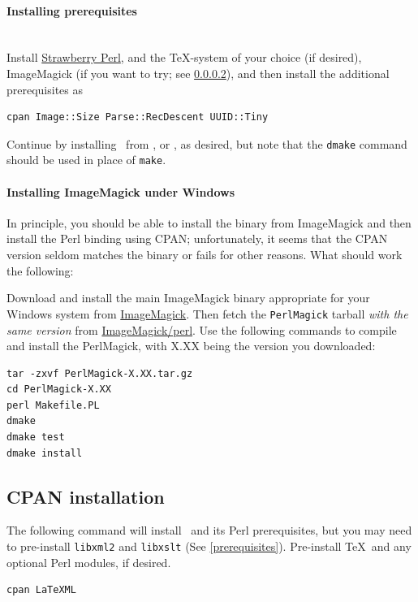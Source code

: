 \documentclass{article}
\begin{document}
\paragraph{Installing prerequisites}\label{install.windows.prereq}\\
Install \href{http://strawberryperl.com}{Strawberry Perl}, and
the \TeX-system of your choice (if desired), 
ImageMagick (if you want to try; see \ref{install.windows.imagemagick}),
and then install the additional prerequisites as
\begin{lstlisting}[style=shell]
cpan Image::Size Parse::RecDescent UUID::Tiny
\end{lstlisting}
Continue by installing \LaTeXML\ from
, 
or , as desired,
but note that the \texttt{dmake} command should be used in place of \texttt{make}.

\paragraph{Installing ImageMagick under Windows}\label{install.windows.imagemagick}
In principle, you should be able to install the binary from ImageMagick
and then install the Perl binding using CPAN; unfortunately, it seems that the
CPAN version seldom matches the binary or fails for other reasons.  What
should work the following:

Download and install the main ImageMagick binary appropriate for your Windows system
from \href{http://imagemagick.org/script/binary-releases.php#windows}{ImageMagick}.
Then fetch the \texttt{PerlMagick} tarball \emph{with the same version} from
\href{http://imagemagick.com/download/perl/}{ImageMagick/perl}.
Use the following commands to compile and install the PerlMagick,
with X.XX being the version you downloaded:
\begin{lstlisting}[style=shell]
tar -zxvf PerlMagick-X.XX.tar.gz
cd PerlMagick-X.XX
perl Makefile.PL
dmake
dmake test
dmake install
\end{lstlisting}

\subsection{CPAN installation}\label{install.cpan}
The following command will install \LaTeXML\ and its Perl prerequisites,
but you may need to pre-install \texttt{libxml2} and  \texttt{libxslt} (See \ref{prerequisites}).
Pre-install \TeX\ and any optional Perl modules, if desired.
\begin{lstlisting}[style=shell]
cpan LaTeXML
\end{lstlisting}
\end{document}
